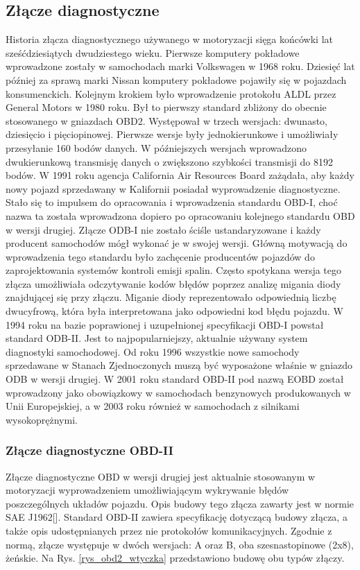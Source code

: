 \documentclass[12pt, twoside]{article} %
\numberwithin{equation}{subsection}
\numberwithin{figure}{section}
\numberwithin{table}{section}
\begin{document}
	\subsection{Złącze diagnostyczne}
		\hspace{0.5cm}Historia złącza diagnostycznego używanego w motoryzacji sięga końcówki lat sześćdziesiątych dwudziestego wieku. Pierwsze komputery pokładowe wprowadzone zostały w samochodach marki Volkswagen w 1968 roku. Dziesięć lat później za sprawą marki Nissan komputery pokładowe pojawiły się w pojazdach konsumenckich. Kolejnym krokiem było wprowadzenie protokołu ALDL  przez General Motors w 1980 roku. Był to pierwszy standard zbliżony do obecnie stosowanego w gniazdach OBD2. Występował w trzech wersjach: dwunasto, dziesięcio i pięciopinowej. Pierwsze wersje były jednokierunkowe i umożliwiały przesyłanie 160 bodów danych. W późniejszych wersjach wprowadzono dwukierunkową transmisję danych o zwiększono szybkości transmisji do 8192 bodów. W 1991 roku agencja California Air Resources Board zażądała, aby każdy nowy pojazd sprzedawany w Kalifornii posiadał wyprowadzenie diagnostyczne. Stało się to impulsem do opracowania i wprowadzenia standardu OBD-I, choć nazwa ta została wprowadzona dopiero po opracowaniu kolejnego standardu OBD w wersji drugiej. Złącze ODB-I nie zostało ściśle ustandaryzowane i każdy producent samochodów mógł wykonać je w swojej wersji. Główną motywacją do wprowadzenia tego standardu było zachęcenie producentów pojazdów do zaprojektowania systemów kontroli emisji spalin. Często spotykana wersja tego złącza umożliwiała odczytywanie kodów błędów poprzez analizę migania diody znajdującej się przy złączu. Miganie diody reprezentowało odpowiednią liczbę dwucyfrową, która była interpretowana jako odpowiedni kod błędu pojazdu. W 1994 roku na bazie poprawionej i uzupełnionej specyfikacji OBD-I powstał standard ODB-II. Jest to najpopularniejszy, aktualnie używany system diagnostyki samochodowej. Od roku 1996 wszystkie nowe samochody sprzedawane w Stanach Zjednoczonych muszą być wyposażone właśnie w gniazdo ODB w wersji drugiej. W 2001 roku standard OBD-II pod nazwą EOBD został wprowadzony jako obowiązkowy w samochodach benzynowych produkowanych w Unii Europejskiej, a w 2003 roku również w samochodach z silnikami wysokoprężnymi.
		
		\newpage
		
		\subsubsection{Złącze diagnostyczne OBD-II}
			\hspace{0.5cm}Złącze diagnostyczne OBD w wersji drugiej jest aktualnie stosowanym w motoryzacji wyprowadzeniem umożliwiającym wykrywanie błędów poszczególnych układów pojazdu. Opis budowy tego złącza zawarty jest w normie SAE J1962[\cite{saej1962}]. Standard OBD-II zawiera specyfikację dotyczącą budowy złącza, a także opis udostępnianych przez nie protokołów komunikacyjnych. Zgodnie z normą, złącze występuje w dwóch wersjach: A oraz B, oba szesnastopinowe (2x8), żeńskie. Na Rys. \ref{rys_obd2_wtyczka} przedstawiono budowę obu typów złączy.
		
\end{document}
